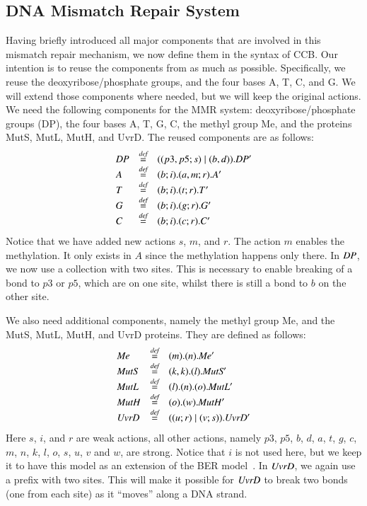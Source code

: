 \subsection{DNA Mismatch Repair System}

Having briefly introduced all major components that are involved in this mismatch repair mechanism, we now
define them in the syntax of CCB. Our intention is to reuse the components from \cite{10.1007/978-3-319-99498-7_8} as much as possible. Specifically, we reuse the deoxyribose/phosphate groups, and the four bases A, T, C, and G. We will extend those components where needed, but we will keep the original actions. We need the following components for the MMR system: deoxyribose/phosphate groups (DP), the four bases A, T, G, C, the methyl group Me, and the proteins MutS, MutL, MutH, and UvrD. The reused components are as follows:
%
$$\begin{array}{lll}
\mathit{DP} & \stackrel{\emph{def}}{=} & ((p3,p5;s) \; \vert \; (b,d)).\mathit{DP}'\\
A & \stackrel{\emph{def}}{=} & (b;i).(a,m;r).A'\\
T & \stackrel{\emph{def}}{=} & (b;i).(t;r).T'\\
G & \stackrel{\emph{def}}{=} & (b;i).(g;r).G'\\
C & \stackrel{\emph{def}}{=} & (b;i).(c;r).C'\\
\end{array}$$
%
Notice that we have added new actions $s$, $m$, and $r$. The action $m$ enables the methylation. It only exists in $A$ since the methylation happens only there. %
In $\mathit{DP}$, we now use a collection with two sites. This is necessary to enable breaking of a bond to $p3$ or $p5$, which are on one site, whilst there is still a bond to $b$ on the other site. %

We also need additional components, namely the methyl group Me, and the MutS, MutL, MutH, and UvrD proteins. They are defined as follows:
$$\begin{array}{lll}
\mathit{Me} & \stackrel{\emph{def}}{=} & (m).(n).\mathit{Me}' \\
\mathit{MutS} & \stackrel{\emph{def}}{=} & (k,k).(l).\mathit{MutS}'\\
\mathit{MutL} & \stackrel{\emph{def}}{=} & (l).(n).(o).\mathit{MutL}'\\
\mathit{MutH} & \stackrel{\emph{def}}{=} & (o).(w).\mathit{MutH}'\\
\mathit{UvrD} & \stackrel{\emph{def}}{=} & ((u;r) \; \vert \; (v;s)).\mathit{UvrD}'\\
\end{array}$$
%
Here $s$, $i$, and $r$ are weak actions, all other actions, namely $p3$, $p5$, $b$, $d$, $a$, $t$, $g$, $c$, $m$, $n$, $k$, $l$, $o$, $s$, $u$, $v$ and $w$, are strong. Notice that $i$ is not used here, but we keep it to have this model as an extension of the BER model~\cite{10.1007/978-3-319-99498-7_8}. In $\mathit{UvrD}$, we again use a prefix with two sites.
This will make it possible for $\mathit{UvrD}$ to break two bonds (one from each site) as it ``moves'' along a DNA strand.


